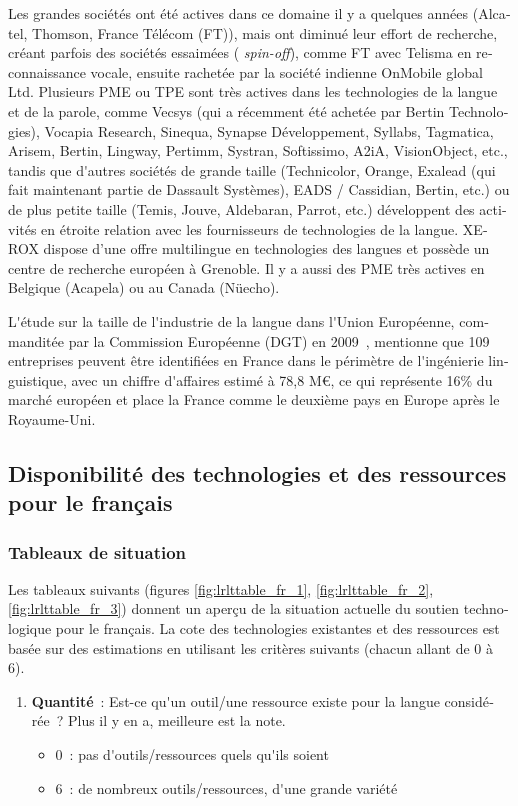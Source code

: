 \documentclass[]{../metanetpaper}
\begin{document}
\begin{french}
\begin{multicols}{2}
Les grandes sociétés ont été actives dans ce domaine il y a quelques
années (Alcatel, Thomson, France Télécom (FT)), mais ont diminué leur
effort de recherche, créant parfois des sociétés essaimées ({\em
  spin-off}), comme FT avec Telisma en reconnaissance vocale, ensuite
rachetée par la société indienne OnMobile global Ltd. Plusieurs PME ou
TPE sont très actives dans les technologies de la langue et de la
parole, comme Vecsys (qui a récemment été achetée par Bertin
Technologies), Vocapia Research, Sinequa, Synapse Développement,
Syllabs, Tagmatica, Arisem, Bertin, Lingway, Pertimm, Systran,
Softissimo, A2iA, VisionObject, etc., tandis que d{\mbox '}autres
sociétés de grande taille (Technicolor, Orange, Exalead (qui fait
maintenant partie de Dassault Systèmes), EADS / Cassidian, Bertin,
etc.) ou de plus petite taille (Temis, Jouve, Aldebaran, Parrot, etc.)
développent des activités en étroite relation avec les fournisseurs de
technologies de la langue. XEROX dispose d'une offre multilingue en
technologies des langues et possède un centre de recherche européen à
Grenoble. Il y a aussi des PME très actives en Belgique (Acapela) ou
au Canada (Nüecho).

L{\mbox '}étude sur la taille de l{\mbox '}industrie de la langue dans l{\mbox '}Union
Européenne, commanditée par la Commission Européenne (DGT) en
2009~\cite{DGT09}, mentionne que 109 entreprises peuvent être
identifiées en France dans le périmètre de l{\mbox '}ingénierie linguistique,
avec un chiffre d{\mbox '}affaires estimé à 78,8 M€, ce qui représente 16\% du
marché européen et place la France comme le deuxième pays en
Europe après le Royaume-Uni.

\subsection{Disponibilité des technologies et des ressources pour le français}

\subsubsection{Tableaux de situation}
Les tableaux suivants (figures \ref{fig:lrlttable_fr_1},
\ref{fig:lrlttable_fr_2}, \ref{fig:lrlttable_fr_3}) donnent un aperçu
de la situation actuelle du soutien technologique pour le français. La
cote des technologies existantes et des ressources est basée sur des
estimations en utilisant les critères suivants (chacun allant de 0 à
6).

\begin{enumerate}
\item {\bf Quantité}~: Est-ce qu{\mbox '}un outil/une ressource existe pour la langue considérée~? Plus il y en a, meilleure est la note.
      \begin{itemize}
      \item 0~: pas d{\mbox '}outils/ressources quels qu{\mbox '}ils soient  
      \item 6~: de nombreux outils/ressources, d{\mbox '}une grande variété 
      \end{itemize}


\end{enumerate}
\end{multicols}
\end{french}
\end{document}
